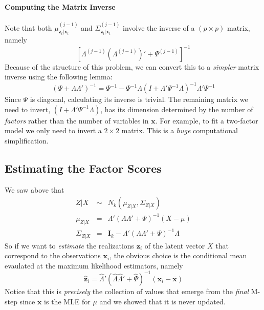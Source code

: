 \paragraph{Computing the Matrix Inverse}
Note that both $\mu^{(j-1)}_{\mathbf{z}_t|\mathbf{x}_t}$ and $\Sigma^{(j-1)}_{\mathbf{z}_t|\mathbf{x}_t}$ involve the inverse of a $(p\times p)$ matrix, namely
	$$\left[\Lambda^{(j-1)} \left(\Lambda^{(j-1)}\right)' + \Psi^{(j-1)}\right]^{-1}$$
Because of the structure of this problem, we can convert this to a \emph{simpler} matrix inverse using the following lemma:
	$$(\Psi + \Lambda \Lambda')^{-1} = \Psi^{-1} - \Psi^{-1} \Lambda\left(I + \Lambda'\Psi^{-1}\Lambda\right)^{-1} \Lambda'\Psi^{-1}$$
Since $\Psi$ is diagonal, calculating its inverse is trivial. The remaining matrix we need to invert, $(I + \Lambda' \Psi^{-1} \Lambda)$, has its dimension determined by the number of \emph{factors} rather than the number of variables in $\mathbf{x}$. For example, to fit a two-factor model we only need to invert a $2\times 2$ matrix. This is a \emph{huge} computational simplification.

\subsection{Estimating the Factor Scores}
We saw above that
	\begin{eqnarray*}
		Z|X &\sim& N_k(\mu_{Z|X}, \Sigma_{Z|X})\\
		\mu_{Z|X} &=& \Lambda' (\Lambda \Lambda' + \Psi)^{-1}(X - \mu) \\
		\Sigma_{Z|X} &=& \mathbf{I}_k - \Lambda'(\Lambda \Lambda' + \Psi)^{-1}\Lambda
	\end{eqnarray*}
So if we want to \emph{estimate} the realizations $\mathbf{z}_i$ of the latent vector $X$ that correspond to the observations $\mathbf{x}_i$, the obvious choice is the conditional mean evaulated at the maximum likelihood estimators, namely
	$$\widehat{\textbf{z}}_i = \widehat{\Lambda}' \left(\widehat{\Lambda} \widehat{\Lambda}' + \widehat{\Psi}\right)^{-1}\left(\textbf{x}_i - \bar{\textbf{x}}\right) $$
Notice that this is \emph{precisely} the collection of values that emerge from the \emph{final} M-step since $\bar{\mathbf{x}}$ is the MLE for $\mu$ and we showed that it is never updated.

